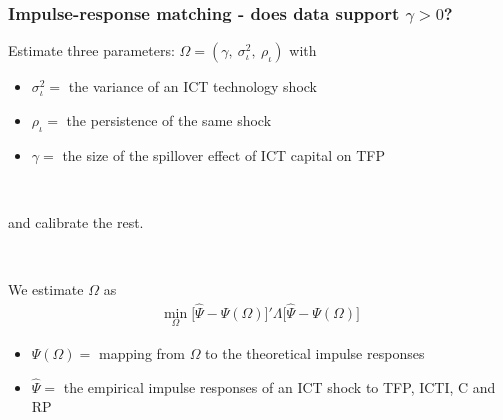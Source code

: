 \documentclass{beamer}
\begin{document}
\begin{frame}
	\frametitle{Impulse-response matching - does data support $\gamma>0$?}
	\label{IRmatching}
	
Estimate three parameters: $\Omega = (\gamma, \ \sigma_{\iota}^2, \ \rho_{\iota})$ with

\begin{itemize}
\item $\sigma_{\iota}^2 =$ the variance of an ICT technology shock
\item $\rho_{\iota}=$ the persistence of the same shock
\item $\gamma=$  the size of the spillover effect of ICT capital on TFP
\end{itemize}

\

and calibrate the rest.  \hyperlink{calibration}{}	



\

We estimate $\Omega$ as
\begin{eqnarray}\label{equation:min_prob_IRmatching}
\min_{\Omega} \big[  \hat{\Psi} - \Psi(\Omega)  \big]' \Lambda \big[  \hat{\Psi} - \Psi(\Omega)  \big]
\end{eqnarray}

\begin{itemize}
\item $\Psi(\Omega) =$ mapping from $\Omega$ to the theoretical impulse responses
\item $\hat{\Psi} =$ the empirical impulse responses of an ICT shock to TFP, ICTI, C and RP
\end{itemize}

\end{frame}
\end{document}
